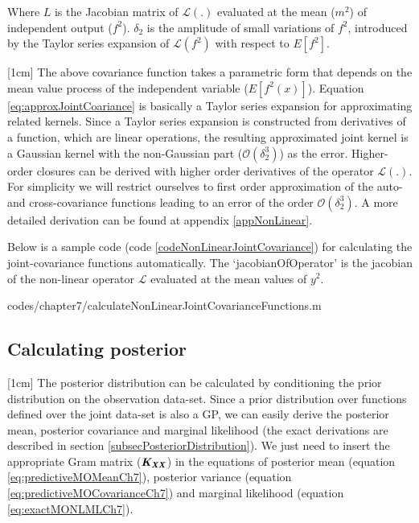 Where $L$ is the Jacobian matrix of \(\mathcal{L}\left ( . \right )\) evaluated at the mean ($m^2$) of independent output (\(f^{2}\)). \(\delta_{2}\) is the amplitude of small variations of \(f^{2}\), introduced by the Taylor series expansion of \(\mathcal{L}(f^2)\) with respect to \(E[f^{2}]\). 

[1cm]
The above covariance function takes a parametric form that depends on the mean value process of the independent variable ($E[f^2(x)]$). Equation \ref{eq:approxJointCoariance} is basically a Taylor series expansion for approximating related kernels. Since a Taylor series expansion is constructed from derivatives of a function, which are linear operations, the resulting approximated joint kernel is a Gaussian kernel with the non-Gaussian part ($\mathcal{O}\left ( \delta_{2}^{3} \right )$) as the error. Higher-order closures can be derived with higher order derivatives of the operator \(\mathcal{L}(.)\). For simplicity we will restrict ourselves to first order approximation of the auto- and cross-covariance functions leading to an error of the order \(\mathcal{O}\left ( \delta_{2}^{3} \right )\).  A more detailed derivation can be found at appendix \ref{appNonLinear}. 

Below is a sample code (code \ref{codeNonLinearJointCovariance}) for calculating the joint-covariance functions automatically. The `jacobianOfOperator' is the jacobian of the non-linear operator $\mathcal{L}$ evaluated at the mean values of $y^2$.

\begin{mdframed}[hidealllines=true,backgroundcolor=lightgray!20]
            {codes/chapter7/calculateNonLinearJointCovarianceFunctions.m}
\end{mdframed}

\subsection{Calculating posterior}\label{sub:MOGPs}
[1cm]
The posterior distribution can be calculated by conditioning the prior distribution on the observation data-set. Since a prior distribution over functions defined over the joint data-set is also a GP, we can easily derive the posterior mean, posterior covariance and marginal likelihood (the exact derivations are described in section \ref{subsecPosteriorDistribution}). We just need to insert the appropriate Gram matrix ($\bm{\mathit{K_{XX}}}$) in the equations of posterior mean (equation \ref{eq:predictiveMOMeanCh7}), posterior variance (equation \ref{eq:predictiveMOCovarianceCh7}) and marginal likelihood (equation \ref{eq:exactMONLMLCh7}). 

